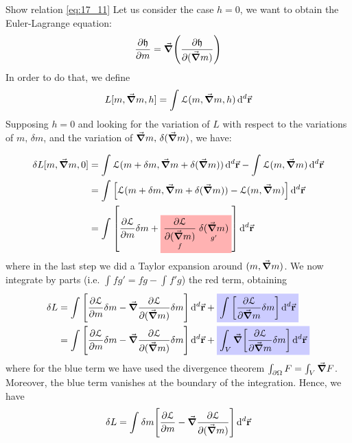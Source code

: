 \documentclass[../main/main.tex]{subfiles}
\begin{document}
\begin{example}{Show relation \eqref{eq:17_11}}{}
Let us consider the case \( h=0 \), we want to obtain the Euler-Lagrange equation:
\begin{equation*}
  \pdv{\mathfrak{h} }{m} = \va{\grad } \qty(  \pdv{\mathfrak{h}}{(\va{\grad } m)})
\end{equation*}
In order to do that, we define
  \begin{equation*}
    L [m, \va{\grad } m,h] = \int_{}^{}  \mathcal{L} (m, \va{\grad } m,h)\dd[d]{\va{r}}
  \end{equation*}
Supposing \( h=0 \)  and looking for the variation of \( L \) with respect to the variations of \( m,\, \delta m \),  and the variation of \( \va{\grad } m, \, \delta (\va{\grad } m) \), we have:

  \begin{equation*}
  \begin{split}
  \delta L [m, \va{\grad } m,0]  &=  \int_{}^{} \mathcal{L} (m+\delta m, \va{\grad } m + \delta (\va{\grad } m))  \dd[d]{\va{r}} - \int_{}^{}  \mathcal{L} (m,\va{\grad } m) \dd[d]{\va{r}}   \\
  & = \int_{}^{}  \qty[\mathcal{L} (m+\delta m, \va{\grad } m + \delta ( \va{\grad } m)) - \mathcal{L} (m, \va{\grad } m)] \dd[d]{\va{r}} \\
  & = \int_{}^{} \qty[\pdv{\mathcal{L}}{m} \delta m +
  \mathcolorbox{red!30}{ \underset{f}{\pdv{\mathcal{L}}{(\va{\grad } m)} } \underset{g'}{\delta (\va{\grad } m) }  }
  ] \dd[d]{\va{r}}
  \end{split}
  \end{equation*}
  where in the last step we did a Taylor expansion around \( (m, \va{\grad } m) \).
  We now integrate by parts (i.e. \( \int_{}^{} f g' = fg - \int_{}^{} f'g     \)) the red term, obtaining
  \begin{equation*}
  \begin{split}
  \delta L &= \int_{}^{} \qty[\pdv{\mathcal{L}}{m} \delta m - \va{\grad } \pdv{\mathcal{L}}{(\va{\grad } m)} \delta m ] \dd[d]{\va{r}} +
  \mathcolorbox{blue!20}{\int_{}^{}  \qty[\pdv{\mathcal{L}}{\va{\grad } m} \delta m ] \dd[d]{\va{r}} }
  \\
   & = \int_{}^{}  \qty[\pdv{\mathcal{L}}{m} \delta m - \va{\grad } \pdv{\mathcal{L}}{(\va{\grad } m)} \delta m ]\dd[d]{\va{r}} + \mathcolorbox{blue!20}{\int_{V}^{}  \va{\grad } \qty[\pdv{\mathcal{L}}{\va{\grad } m} \delta m ] \dd[d]{\va{r}} }
  \end{split}
  \end{equation*}
  where for the blue term we have used the divergence theorem \( \int_{\partial{ \Omega }}^{} F = \int_{V}^{} \va{\grad } F     \). Moreover, the blue term vanishes at the boundary of the integration. Hence, we have
  \begin{equation*}
    \delta L = \int_{}^{} \delta m \qty[\pdv{\mathcal{L}}{m} - \va{\grad } \pdv{\mathcal{L}}{(\va{\grad } m)}  ]  \dd[d]{\va{r}}
  \end{equation*}


\end{example}
\end{document}
